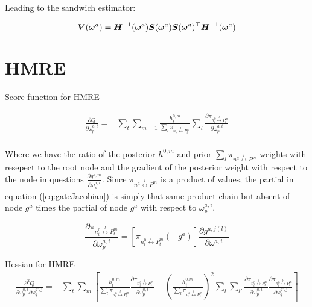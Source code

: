 \documentclass[12pt]{article}
\begin{document}
Leading to the sandwich estimator:

\begin{equation} \label{eq:robustgatevarcov}
  \boldsymbol{V}(\boldsymbol{\omega}^{a}) = \boldsymbol{H}^{-1}(\boldsymbol{\omega}^{a}) \boldsymbol{S}(\boldsymbol{\omega}^{a}) \boldsymbol{S}(\boldsymbol{\omega}^{a})^\top \boldsymbol{H}^{-1}(\boldsymbol{\omega}^{a})
\end{equation}
\section{HMRE}


Score function for HMRE

\begin{equation} \label{eq:gateJacobian}
  \begin{split}
    \frac{\partial Q}{\partial \omega^{a,i}_{p}} =& \sum_{t} \sum_{m=1}  \frac{h^{0,m}_{t}}{\sum_{l} \pi_{n^{0}_{t} \overset{l}{\longleftrightarrow} P^{m}_{t}}} \sum_{l} \frac{\partial \pi_{n^{0}_{t} \overset{l}{\longleftrightarrow} P^{m}_{t}}}{\partial \omega^{a,i}_{p}} \\
  \end{split}
\end{equation}

Where we have the ratio of the posterior $h^{0,m}$ and prior 
$\sum_{l} \pi_{n^{a} \overset{l}{\longleftrightarrow} P^{m}}$ weights with resepect
to the root node and the gradient of the posterior weight with respect to the node
in questions $\frac{\partial g^{a,m}}{\partial \omega^{a,i}_{p}}$. Since
$\pi_{n^{a} \overset{l}{\longleftrightarrow} P^{m}}$ is a product of values, the
partial in equation (\ref{eq:gateJacobian}) is simply that same product chain but
absent of node $g^a$ times the partial of node $g^a$ with respect to
$\omega^{a,i}_{p}$.

\begin{equation} \label{eq:gatechainpartial}
  \frac{\partial \pi_{n^{0}_{t} \overset{l}{\longleftrightarrow} P^{m}_{t}}}{\partial \omega^{a,i}_{p}} = [\pi_{n^{0}_{t} \overset{l}{\longleftrightarrow} P^{m}_{t}} (-g^{a})] \frac{\partial g^{a, j(l)}}{\partial \omega^{a, i}}
\end{equation}



Hessian for HMRE
\begin{equation}
  \begin{split}
    \frac{\partial^{2} Q}{\partial \omega^{a,i}_{p} \partial \omega^{a',j}_{q}} =& \sum_{t} \sum_{m} \left[  \frac{h^{0,m}_{t}}{\sum_{l} \pi_{n^{0}_{t} \overset{l}{\longleftrightarrow} P^{m}_{t}}} \frac{\partial \pi_{n^{0}_{t} \overset{l}{\longleftrightarrow} P^{m}_{t}}}{\partial \omega^{a,i}_{p}} - \left( \frac{h^{0,m}_{t}}{\sum_{l} \pi_{n^{0}_{t} \overset{l}{\longleftrightarrow} P^{m}_{t}}} \right)^{2} \sum_{l} \sum_{l'} \frac{\partial \pi_{n^{0}_{t} \overset{l}{\longleftrightarrow} P^{m}_{t}}}{\partial \omega^{a,i}_{p}}  \frac{\partial \pi_{n^{0}_{t} \overset{l'}{\longleftrightarrow} P^{m}_{t}}}{\partial \omega^{a',j}_{q}} \right]
  \end{split}
\end{equation}
\end{document}

